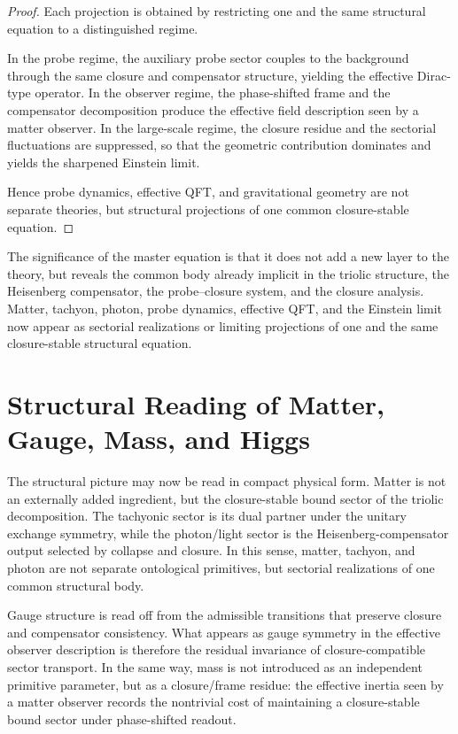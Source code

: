 \documentclass[12pt,a4paper]{article}
\begin{document}
\begin{proof}
Each projection is obtained by restricting one and the same structural
equation to a distinguished regime.

In the probe regime, the auxiliary probe sector couples to the background
through the same closure and compensator structure, yielding the effective
Dirac-type operator. In the observer regime, the phase-shifted frame and the
compensator decomposition produce the effective field description seen by a
matter observer. In the large-scale regime, the closure residue and the
sectorial fluctuations are suppressed, so that the geometric contribution
dominates and yields the sharpened Einstein limit.

Hence probe dynamics, effective QFT, and gravitational geometry are not
separate theories, but structural projections of one common closure-stable
equation.
\end{proof}

The significance of the master equation is that it does not add a new layer to
the theory, but reveals the common body already implicit in the triolic
structure, the Heisenberg compensator, the probe--closure system, and the
closure analysis. Matter, tachyon, photon, probe dynamics, effective QFT, and
the Einstein limit now appear as sectorial realizations or limiting
projections of one and the same closure-stable structural equation.

\section{Structural Reading of Matter, Gauge, Mass, and Higgs}
\label{sec:structural-reading-physics}

The structural picture may now be read in compact physical form. Matter is not
an externally added ingredient, but the closure-stable bound sector of the
triolic decomposition. The tachyonic sector is its dual partner under the
unitary exchange symmetry, while the photon/light sector is the
Heisenberg-compensator output selected by collapse and closure. In this sense,
matter, tachyon, and photon are not separate ontological primitives, but
sectorial realizations of one common structural body.

Gauge structure is read off from the admissible transitions that preserve
closure and compensator consistency. What appears as gauge symmetry in the
effective observer description is therefore the residual invariance of
closure-compatible sector transport. In the same way, mass is not introduced
as an independent primitive parameter, but as a closure/frame residue: the
effective inertia seen by a matter observer records the nontrivial cost of
maintaining a closure-stable bound sector under phase-shifted readout.
\end{document}
